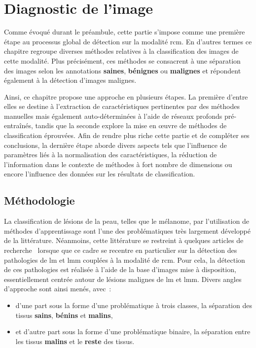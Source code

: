 \renewcommand{\thechapter}{\arabic{chapter}}
\setcounter{chapter}{4}

\chapter{Diagnostic de l'image}
\label{chap:chapter_4}
\chapterintro
Comme évoqué durant le préambule, cette partie s'impose comme une première étape au processus global de détection sur la modalité \gls{rcm}. En d'autres termes ce chapitre regroupe diverses méthodes relatives à la classification des images de cette modalité. Plus précisément, ces méthodes se consacrent à une séparation des images selon les annotations \textbf{saines}, \textbf{bénignes} ou \textbf{malignes} et répondent également à la détection d'images malignes.\par

Ainsi, ce chapitre propose une approche en plusieurs étapes. La première d'entre elles se destine à l'extraction de caractéristiques pertinentes par des méthodes manuelles mais également auto-déterminées à l'aide de réseaux profonds pré-entraînés, tandis que la seconde explore la mise en œuvre de méthodes de classification éprouvées. Afin de rendre plus riche cette partie et de compléter ses conclusions, la dernière étape aborde divers aspects tels que l'influence de paramètres liés à la normalisation des caractéristiques, la réduction de l'information dans le contexte de méthodes à fort nombre de dimensions ou encore l'influence des données sur les résultats de classification.\par	
\newpage

\section{Méthodologie}
La classification de lésions de la peau, telles que le mélanome, par l'utilisation de méthodes d'apprentissage sont l'une des problématiques très largement développé de la littérature. Néanmoins, cette littérature se restreint à quelques articles de recherche~\cite{Halimi2017a, Halimi2017b, Wiltgen2008, Koller2011} lorsque que ce cadre se recentre en particulier sur la détection des pathologies de \gls{lm} et \gls{lmm} couplées à la modalité de \gls{rcm}. Pour cela, la détection de ces pathologies est réalisée à l'aide de la base d'images mise à disposition, essentiellement centrée autour de lésions malignes de \gls{lm} et \gls{lmm}. Divers angles d'approche sont ainsi menés, avec~: 
\begin{itemize}
    \item d'une part sous la forme d'une problématique à trois classes, la séparation des tissus \textbf{sains}, \textbf{bénins} et \textbf{malins},
    \item et d'autre part sous la forme d'une problématique binaire, la séparation entre les tissus \textbf{malins} et le \textbf{reste} des tissus.
\end{itemize}\par

